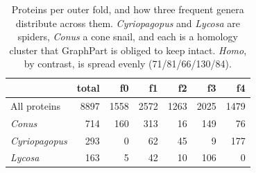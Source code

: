 \documentclass{article}
\begin{document}
\begin{table}[h]
\centering
\caption{Proteins per outer fold, and how three frequent genera distribute across them. \emph{Cyriopagopus} and \emph{Lycosa} are spiders, \emph{Conus} a cone snail, and each is a homology cluster that GraphPart is obliged to keep intact. \textit{Homo}, by contrast, is spread evenly (71/81/66/130/84).}
\label{tab:genus}
\small
\begin{tabular}{lrrrrrr}
\toprule
 & \textbf{total} & \textbf{f0} & \textbf{f1} & \textbf{f2} & \textbf{f3} & \textbf{f4} \\
\midrule
All proteins & 8897 & 1558 & 2572 & 1263 & 2025 & 1479 \\
\midrule
\textit{Conus} & 714 & 160 & 313 & 16 & 149 & 76 \\
\textit{Cyriopagopus} & 293 & 0 & 62 & 45 & 9 & 177 \\
\textit{Lycosa} & 163 & 5 & 42 & 10 & 106 & 0 \\
\bottomrule
\end{tabular}
\end{table}


\end{document}
